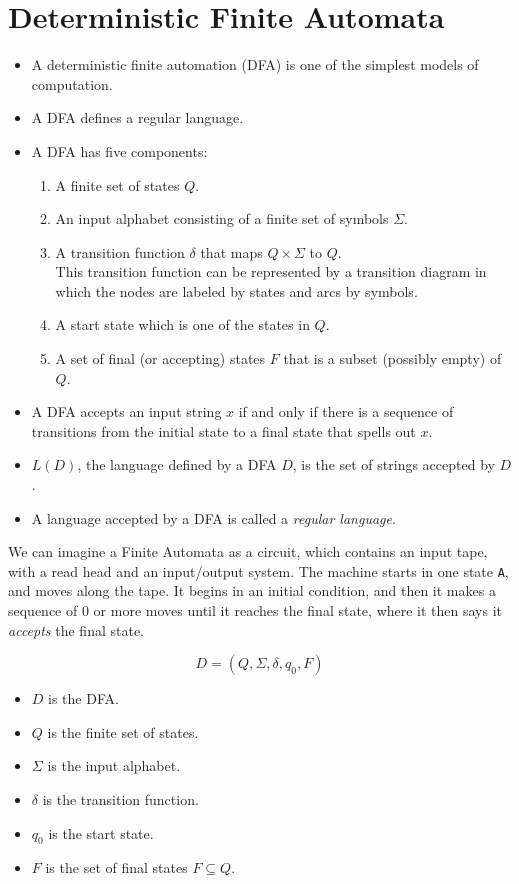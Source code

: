 \documentclass[]{article}
\begin{document}
\section{Deterministic Finite Automata}
  \begin{itemize}
    \item A deterministic finite automation (DFA) is one of the simplest
    models of computation.
    \item A DFA defines a regular language.
    \item A DFA has five components:
      \begin{enumerate}
        \item A finite set of states $Q$.
        \item An input alphabet consisting of a finite set of symbols
        $\Sigma$.
        \item A transition function $\delta$ that maps $Q \times \Sigma$ to
        $Q$.\\
        This transition function can be represented by a transition diagram in
        which the nodes are labeled by states and arcs by symbols.
        \item A start state which is one of the states in $Q$.
        \item A set of final (or accepting) states $F$ that is a subset
        (possibly empty) of $Q$.
      \end{enumerate}
    \item A DFA accepts an input string $x$ if and only if there is a sequence
    of transitions from the initial state to a final state that spells out
    $x$.
    \item $L(D)$, the language defined by a DFA $D$, is the set of strings
    accepted by $D$.
    \item A language accepted by a DFA is called a \emph{regular language}.
  \end{itemize}
  We can imagine a Finite Automata as a circuit, which contains an input tape,
  with a read head and an input/output system. The machine starts in one state
  \texttt{A}, and moves along the tape. It begins in an initial condition, and
  then it makes a sequence of 0 or more moves until it reaches the final
  state, where it then says it \emph{accepts} the final state.

    \[ D = (Q, \Sigma, \delta, q_0, F) \]

  \begin{itemize}
    \item $D$ is the DFA.
    \item $Q$ is the finite set of states.
    \item $\Sigma$ is the input alphabet.
    \item $\delta$ is the transition function.
    \item $q_0$ is the start state.
    \item $F$ is the set of final states $F \subseteq Q$.
  \end{itemize}
\end{document}
